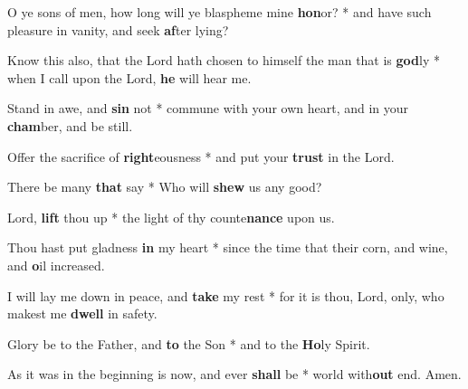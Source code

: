 \begin{multicols}{2}
	O ye sons of men, how long will ye blaspheme mine \textbf{hon}or? * and have such pleasure in vanity, and seek \textbf{af}ter lying?
	
	Know this also, that the Lord hath chosen to himself the man that is \textbf{god}ly * when I call upon the Lord, \textbf{he} will hear me.
	
	Stand in awe, and \textbf{sin} not * commune with your own heart, and in your \textbf{cham}ber, and be still.
	
	Offer the sacrifice of \textbf{right}eousness * and put your \textbf{trust} in the Lord.
	
	There be many \textbf{that} say * Who will \textbf{shew} us any good?
	
	Lord, \textbf{lift} thou up * the light of thy counte\textbf{nance} upon us.
	
	Thou hast put gladness \textbf{in} my heart * since the time that their corn, and wine, and \textbf{o}il increased.
	
	I will lay me down in peace, and \textbf{take} my rest * for it is thou, Lord, only, who makest me \textbf{dwell} in safety.
	
	Glory be to the Father, and \textbf{to} the Son * and to the \textbf{Ho}ly Spirit.
	
	As it was in the beginning is now, and ever \textbf{shall} be * world with\textbf{out} end. Amen.
\end{multicols}